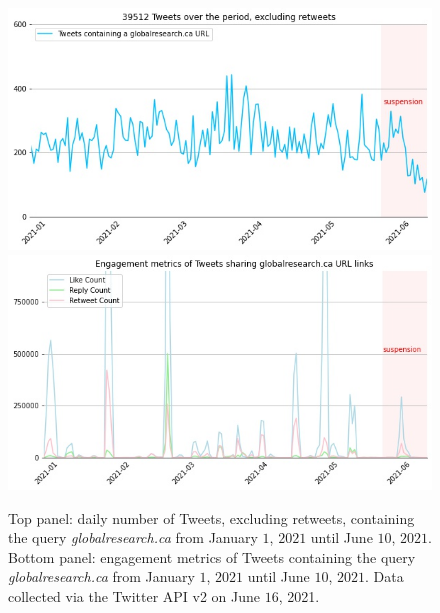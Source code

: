 \documentclass{article}
\begin{document}
\smallskip


\begin{figure}
\centering
	\begin{multicols}{1}
		\includegraphics[scale=0.35]{./img/globalresearch/sum_globalresearch.ca_6_months.jpg} 
		\includegraphics[scale=0.35]{./img/globalresearch/engagement_sum_rolling_1_globalresearch.ca.jpg}
	\end{multicols}
\caption{Top panel: daily number of Tweets, excluding retweets, containing the query {\it globalresearch.ca} from January $1$, $2021$ until June $10$, $2021$. Bottom panel: engagement metrics of Tweets containing the query {\it globalresearch.ca} from January $1$, $2021$ until June $10$, $2021$. Data collected via the Twitter API v2 on June $16$, 2021.   }
\label{fig4}
\end{figure}
\end{document}
